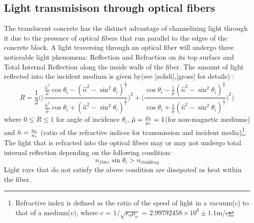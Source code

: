 \documentclass[times, 10pt,a4paper]{article}
\begin{document}
\subsection{Light transmisison through optical fibers}
The translucent concrete has the distinct advantage of channelizing light through it due to the presence of optical fibers that
run parallel to the edges of the concrete block. A light traversing through an optical fiber will undergo three noticeable light 
phenomena: Reflection and Refraction on its top surface and Total Internal Reflection along the inside walls of the fiber. 
The amount of light reflected into the incident medium is given by(see [zohdi],[gross] for details) : 
\begin{equation}
R = \frac{1}{2}\Bigg(\Bigg(\frac{\frac{\hat{n}^2}{\hat\mu} \cos \theta_i  - (\hat{n}^2 - \sin^2\theta_i)^{\frac{1}{2}}}{\frac{\hat{n}^2}{\hat\mu} \cos \theta_i  + (\hat{n}^2 - \sin^2\theta_i)^{\frac{1}{2}}}\Bigg)^2 + 
 \Bigg(\frac{\cos \theta_i  - \frac{1}{\hat\mu} (\hat{n}^2 - \sin^2\theta_i)^{\frac{1}{2}}}{\cos \theta_i  + \frac{1}{\hat\mu}(\hat{n}^2 - \sin^2\theta_i)^{\frac{1}{2}}}\Bigg)^2 \Bigg)
\end{equation}
where $0\le R \le 1$ for angle of incidence $\theta_i$, $\hat\mu = {\mu_t \over \mu_i} = 1$(for non-magnetic mediums) and $\hat n = {n_t \over n_i}$ (ratio of the refractive
indices for transmission and incident media)\footnote[1]{Refractive index is defined as the ratio of the speed of light in a vacuum($c$) to that of 
a medium($v$), where $c$ = $1/\sqrt{\epsilon_o\mu_o}$ = $2.99792458 \times 10^8 \pm 1.1$m/s}. 
The light that is refracted into the 
optical fibers may or may not undergo total internal reflection depending on the following condition:
\begin{equation}
n_{fiber} \sin\theta_i > n_{cladding}
\end{equation}
Light rays that do not satisfy the above condition are dissipated as heat within the fiber.
%
\end{document}
